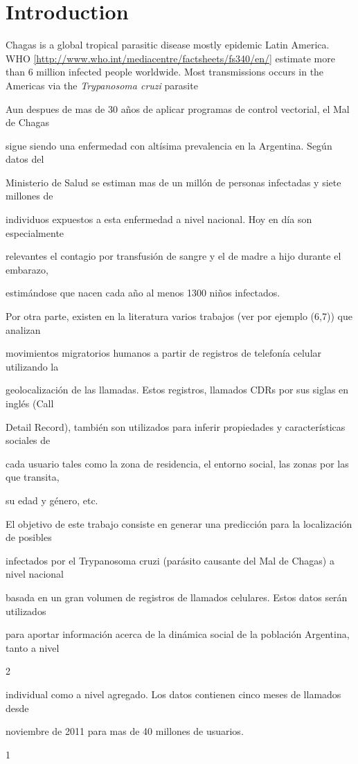\section{Introduction}

Chagas is a global tropical parasitic disease mostly epidemic Latin America. WHO \ref{http://www.who.int/mediacentre/factsheets/fs340/en/} estimate more than 6 million infected people worldwide. Most transmissions occurs in the Americas via the \textit{Trypanosoma cruzi} parasite 


Aun despues de mas de 30 años de aplicar programas de control vectorial, el Mal de Chagas

sigue siendo una enfermedad con altísima prevalencia en la Argentina. Según datos del

Ministerio de Salud se estiman mas de un millón de personas infectadas y siete millones de

individuos expuestos a esta enfermedad a nivel nacional. Hoy en día son especialmente

relevantes el contagio por transfusión de sangre y el de madre a hijo durante el embarazo,

estimándose que nacen cada año al menos 1300 niños infectados.

Por otra parte, existen en la literatura varios trabajos (ver por ejemplo (6,7)) que analizan

movimientos migratorios humanos a partir de registros de telefonía celular utilizando la

geolocalización de las llamadas. Estos registros, llamados CDRs por sus siglas en inglés (Call

Detail Record), también son utilizados para inferir propiedades y características sociales de

cada usuario tales como la zona de residencia, el entorno social, las zonas por las que transita,

su edad y género, etc.

El objetivo de este trabajo consiste en generar una predicción para la localización de posibles

infectados por el Trypanosoma cruzi (parásito causante del Mal de Chagas) a nivel nacional

basada en un gran volumen de registros de llamados celulares. Estos datos serán utilizados

para aportar información acerca de la dinámica social de la población Argentina, tanto a nivel

2

individual como a nivel agregado. Los datos contienen cinco meses de llamados desde

noviembre de 2011 para mas de 40 millones de usuarios.

1